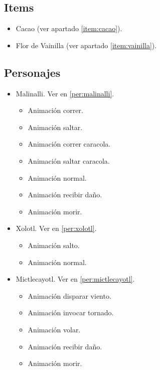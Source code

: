         \subsection{Items}
\begin{itemize}
        \item   Cacao (ver apartado \ref{item:cacao}).
        \item Flor de Vainilla (ver apartado \ref{item:vainilla}).
\end{itemize}
        \subsection{Personajes}
        \begin{itemize}
                \item Malinalli. Ver en \ref{per:malinalli}.
                \begin{itemize}
                        \item Animación correr.
                        \item Animación saltar.
                        \item Animación correr caracola.
                        \item Animación saltar caracola.
                        \item Animación normal.
                        \item Animación recibir daño.
						\item Animación morir.
                \end{itemize} 
                \item Xolotl. Ver en \ref{per:xolotl}.
                \begin{itemize}
					\item Animación salto.
					\item Animación normal.
				\end{itemize}
                \item Mictlecayotl. Ver en \ref{per:mictlecayotl}.
                \begin{itemize}
                        \item Animación disparar viento.
                        \item Animación invocar tornado.
                        \item Animación volar.
                        \item Animación recibir daño.
						\item Animación morir.
                \end{itemize} 
        \end{itemize}

